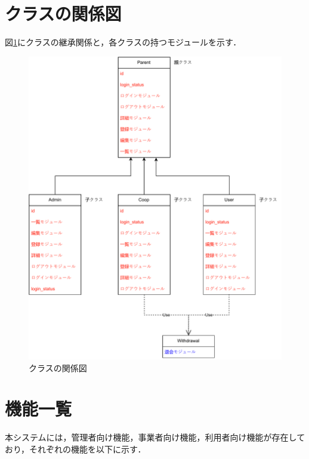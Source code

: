 \documentclass[a4paper, titlepage]{jsarticle}
\begin{document}
\section{クラスの関係図}
図\ref{fig:class_tree}にクラスの継承関係と，各クラスの持つモジュールを示す．
\begin{figure}[H]
  \centering
  \includegraphics[width=\linewidth]{fig/class_tree.pdf}
  \caption{クラスの関係図}
  \label{fig:class_tree}
\end{figure}

\section{機能一覧}
本システムには，管理者向け機能，事業者向け機能，利用者向け機能が存在しており，それぞれの機能を以下に示す．
\end{document}
